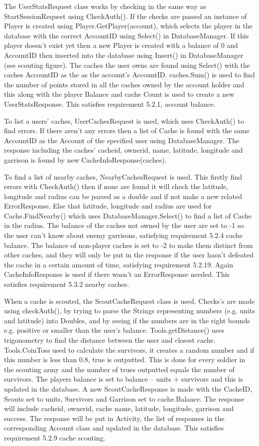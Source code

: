 The UserStatsRequest class works by checking in the same way as StartSessionRequest using CheckAuth(). If the checks are passed an instance of Player is created using Player.GetPlayer(account), which selects the player in the database with the correct AccountID using Select() in DatabaseManager. If this player doesn't exist yet then a new Player is created with a balance of 0 and AccountID then inserted into the database using Insert() in DatabaseManager (see scouting figure). The caches the user owns are found using Select() with the caches AccountID as the as the account's AccountID. caches.Sum() is used to find the number of points stored in all the caches owned by the account holder and this along with the player Balance and cache Count is used to create a new UserStatsResponse. This satisfies requirement 5.2.1, account balance.

To list a users' caches, UserCachesRequest is used, which uses CheckAuth() to find errors. If there aren't any errors then a list of Cache is found with the same AccountID as the Account of the specified user using DatabaseManager. The response including the caches' cacheid, ownerid, name, latitude, longitude and garrison is found by new CacheInfoResponse(caches).

To find a list of nearby caches, NearbyCachesRequest is used. This firstly find errors with CheckAuth() then if none are found it will check the latitude, longitude and radius can be parsed as a double and if not make a new related ErrorResponse. Else that latitude, longitude and radius are used for Cache.FindNearby() which uses DatabaseManager.Select() to find a list of Cache in the radius. The balance of the caches not owned by the user are set to -1 so the user can't know about enemy garrisons, satisfying requirement 5.2.4 cache balance. The balance of non-player caches is set to -2 to make them distinct from other caches, and they will only be put in the response if the user hasn't defeated the cache in a certain amount of time, satisfying requirement 5.2.19. Again CacheInfoResponse is used if there wasn't an ErrorResponse needed. This satisfies requirement 5.3.2 nearby caches.

When a cache is scouted, the ScoutCacheRequest class is used. Checks's are made using checkAuth(), by trying to parse the Strings representing numbers (e.g. units and latitude) into Doubles, and by seeing if the numbers are in the right bounds e.g. positive or smaller than the user's balance. Tools.getDistance() uses trigonometry to find the distance between the user and closest cache. Tools.CoinToss used to calculate the survivors, it creates a random number and if this number is less than 0.8, true is outputted. This is done for every soldier in the scouting army and the number of trues outputted equals the number of survivors. The players balance is set to balance – units + survivors and this is updated in the database. A new ScoutCacheResponse is made with the CacheID, Scouts set to units, Survivors and Garrison set to cache.Balance. The response will include cacheid, ownerid, cache name, latitude, longitude, garrison and success. The response will be put in Activity, the list of responses in the corresponding Account class and updated in the database. This satisfies requirement 5.2.9 cache scouting.

